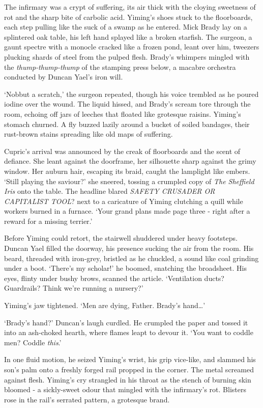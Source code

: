 The infirmary was a crypt of suffering, its air thick with the cloying sweetness of rot and the sharp bite of carbolic acid. Yiming's shoes stuck to the floorboards, each step pulling like the suck of a swamp as he entered. Mick Brady lay on a splintered oak table, his left hand splayed like a broken starfish. The surgeon, a gaunt spectre with a monocle cracked like a frozen pond, leant over him, tweezers plucking shards of steel from the pulped flesh. Brady's whimpers mingled with the \textit{thump-thump-thump} of the stamping press below, a macabre orchestra conducted by Duncan Yael's iron will.

`Nobbut a scratch,' the surgeon repeated, though his voice trembled as he poured iodine over the wound. The liquid hissed, and Brady's scream tore through the room, echoing off jars of leeches that floated like grotesque raisins. Yiming's stomach churned. A fly buzzed lazily around a bucket of soiled bandages, their rust-brown stains spreading like old maps of suffering.

Cupric's arrival was announced by the creak of floorboards and the scent of defiance. She leant against the doorframe, her silhouette sharp against the grimy window. Her auburn hair, escaping its braid, caught the lamplight like embers. `Still playing the saviour?' she sneered, tossing a crumpled copy of \textit{The Sheffield Iris} onto the table. The headline blared \textit{SAFETY CRUSADER OR CAPITALIST TOOL}? next to a caricature of Yiming clutching a quill while workers burned in a furnace. `Your grand plans made page three - right after a reward for a missing terrier.'

Before Yiming could retort, the stairwell shuddered under heavy footsteps. Duncan Yael filled the doorway, his presence sucking the air from the room. His beard, threaded with iron-grey, bristled as he chuckled, a sound like coal grinding under a boot. `There's my scholar!' he boomed, snatching the broadsheet. His eyes, flinty under bushy brows, scanned the article. `Ventilation ducts? Guardrails? Think we're running a nursery?'

Yiming's jaw tightened. `Men are dying, Father. Brady's hand\dots'

`Brady's hand?' Duncan's laugh curdled. He crumpled the paper and tossed it into an ash-choked hearth, where flames leapt to devour it. `You want to coddle men? Coddle \textit{this}.'

In one fluid motion, he seized Yiming's wrist, his grip vice-like, and slammed his son's palm onto a freshly forged rail propped in the corner. The metal screamed against flesh. Yiming's cry strangled in his throat as the stench of burning skin bloomed - a sickly-sweet odour that mingled with the infirmary's rot. Blisters rose in the rail's serrated pattern, a grotesque brand.

